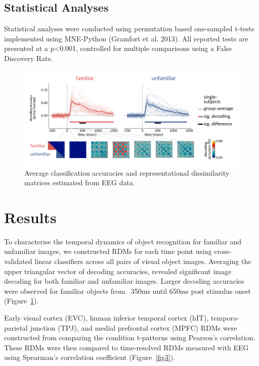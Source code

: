\documentclass[10pt,letterpaper]{article}
\begin{document}
\subsection{Statistical Analyses}

Statistical analyses were conducted using permutation based one-sampled t-tests
implemented using MNE-Python (Gramfort et al. 2013). All reported tests are
presented at a p\textless0.001, controlled for multiple comparisons using a False
Discovery Rate.

\begin{figure}[ht]
  \begin{center}
  \includegraphics[width=\linewidth]{figures/figure2_smaller.png}
  \end{center}
  \caption{
    Average classification accuracies and representational dissimilarity
    matrices estimated from EEG data.
  } 
  \label{fig2}
  \end{figure}

\section{Results}

To characterise the temporal dynamics of object recognition for familiar and
unfamiliar images, we constructed RDMs for each time point using cross-validated
linear classifiers across all pairs of visual object images. Averaging the upper
triangular vector of decoding accuracies, revealed significant image decoding
for both familiar and unfamiliar images. Larger decoding accuracies were
observed for familiar objects from ~350ms until 650ms post stimulus onset
(Figure~\ref{fig2}). 

Early visual cortex (EVC), human inferior temporal cortex (hIT),
temporo-parietal junction (TPJ), and medial prefrontal cortex (MPFC) RDMs were
constructed from comparing the condition t-patterns using Pearson’s correlation.
These RDMs were then compared to time-resolved RDMs measured with EEG using
Spearman’s correlation coefficient (Figure~\ref{fig3}). 
\end{document}
